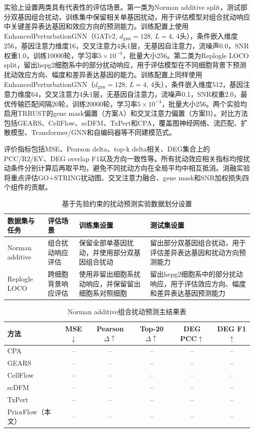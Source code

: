 实验上设置两类具有代表性的评估场景。第一类为Norman additive split，测试部分双基因组合扰动，训练集中保留相关单基因扰动，用于评估模型对组合扰动响应中关键差异表达基因和效应方向的预测能力。训练配置上使用EnhancedPerturbationGNN（GATv2, $d_{\mathrm{gnn}}=128$, $L=4$, 4头），条件嵌入维度256，基因注意力维度16，交叉注意力4头1层，无基因自注意力，流噪声0.0，SNR权重1.0，训练10000轮，学习率$5\times10^{-4}$，批量大小256。第二类为Replogle LOCO split，留出hepg2细胞系中的部分扰动响应，用于评估模型在不同细胞背景下预测扰动效应方向、幅度和差异表达基因的能力。训练配置上同样使用EnhancedPerturbationGNN（$d_{\mathrm{gnn}}=128$, $L=4$, 4头），条件嵌入维度512，基因注意力维度64，交叉注意力4头1层，无基因自注意力，流噪声0.1，SNR权重2.0，最优传输匹配间隔20轮，训练20000轮，学习率$5\times10^{-4}$，批量大小256。两个实验均启用TRRUST的gene mask偏置（方案A）和交叉注意力偏置（方案B）。对比方法包括GEARS、CellFlow、scDFM、TxPert和CPA，覆盖图神经网络、流匹配、扩散模型、Transformer/GNN和自编码器等不同建模范式。

评价指标包括MSE、Pearson delta、top-k delta相关、DEG集合上的PCC/R2/EV、DEG overlap F1以及方向一致性等。所有扰动效应相关指标均按扰动条件分别计算后再取平均，避免不同扰动方向在全局平均中相互抵消。消融实验将重点评估GO+STRING扰动图、交叉注意力融合、gene mask和SNR加权损失四个组件的贡献。

\begin{table}[ht]
\centering
\small
\caption{基于先验约束的扰动预测实验数据划分设置}
\begin{tabular}{|p{3.2cm}|p{3.0cm}|p{4.0cm}|p{4.0cm}|}
\hline
\textbf{数据集与任务} & \textbf{评估场景} & \textbf{训练集设置} & \textbf{测试集设置} \\
\hline
Norman additive & 组合扰动响应评估 & 保留全部单基因扰动，并使用部分双基因组合扰动 & 留出部分双基因组合扰动，用于评估差异表达基因和扰动方向预测能力 \\
\hline
Replogle LOCO & 跨细胞背景响应评估 & 使用非留出细胞系扰动响应，并保留留出细胞系对照细胞 & 留出hepg2细胞系中的部分扰动响应，用于评估效应方向、幅度和差异表达基因预测能力 \\
\hline
\end{tabular}
\end{table}

\begin{table}[ht]
\centering
\small
\caption{Norman additive组合扰动预测主结果表}
\begin{tabular}{|p{2.7cm}|c|c|c|c|c|}
\hline
\textbf{方法} & \textbf{MSE$\downarrow$} & \textbf{Pearson $\Delta\uparrow$} & \textbf{Top-20 $\Delta\uparrow$} & \textbf{DEG PCC$\uparrow$} & \textbf{DEG F1$\uparrow$} \\
\hline
CPA & -- & -- & -- & -- & -- \\
\hline
GEARS & -- & -- & -- & -- & -- \\
\hline
CellFlow & -- & -- & -- & -- & -- \\
\hline
scDFM & -- & -- & -- & -- & -- \\
\hline
TxPert & -- & -- & -- & -- & -- \\
\hline
PriorFlow（本文） & -- & -- & -- & -- & -- \\
\hline
\end{tabular}
\end{table}

